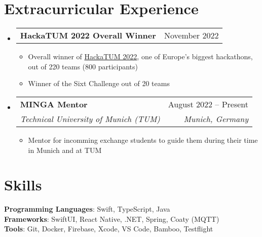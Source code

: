 \documentclass[letterpaper,11pt]{article}
\makeatletter
\newcommand{\resumeItem}[1]{
  \item\small{
    {#1 \vspace{-2pt}}
  }
}
\newcommand{\resumeSubheading}[4]{
  \vspace{-2pt}\item
    \begin{tabular*}{0.97\textwidth}[t]{l@{\extracolsep{\fill}}r}
      \textbf{#1} & #2 \\
      \textit{\small#3} & \textit{\small #4} \\
    \end{tabular*}\vspace{-7pt}
}
\newcommand{\resumeProjectHeading}[2]{
    \item
    \begin{tabular*}{0.97\textwidth}{l@{\extracolsep{\fill}}r}
      \small#1 & #2 \\
    \end{tabular*}\vspace{-7pt}
}
\newcommand{\resumeSubHeadingListStart}{\begin{itemize}[leftmargin=0.15in, label={}]}
\newcommand{\resumeSubHeadingListEnd}{\end{itemize}}
\newcommand{\resumeItemListStart}{\begin{itemize}}
\newcommand{\resumeItemListEnd}{\end{itemize}\vspace{-5pt}}
\makeatother
\begin{document}
\section{Extracurricular Experience}
\resumeSubHeadingListStart
\resumeProjectHeading
    {\textbf{HackaTUM 2022 Overall Winner}}{November 2022}
    \resumeItemListStart
      \resumeItem{Overall winner of \href{https://devpost.com/software/sixtcharge}{HackaTUM 2022}, one of Europe's biggest hackathons, out of 220 teams (800 participants)}
      \resumeItem{Winner of the Sixt Challenge out of 20 teams}
  \resumeItemListEnd
  \resumeSubheading
    {MINGA Mentor}{August 2022 -- Present}
    {Technical University of Munich (TUM)}{Munich, Germany}
    \resumeItemListStart
    \resumeItem{Mentor for incomming exchange students to guide them during their time in Munich and at TUM}
  \resumeItemListEnd
\resumeSubHeadingListEnd

\section{Skills}
 \begin{itemize}[leftmargin=0.15in, label={}]
    \small{\item{
     \textbf{Programming Languages}{: Swift, TypeScript, Java} \\

     \textbf{Frameworks}{: SwiftUI, React Native, .NET, Spring, Coaty (MQTT)} \\
     \textbf{Tools}{: Git, Docker, Firebase, Xcode, VS Code, Bamboo, Testflight} \\
    }}
 \end{itemize}

\end{document}
